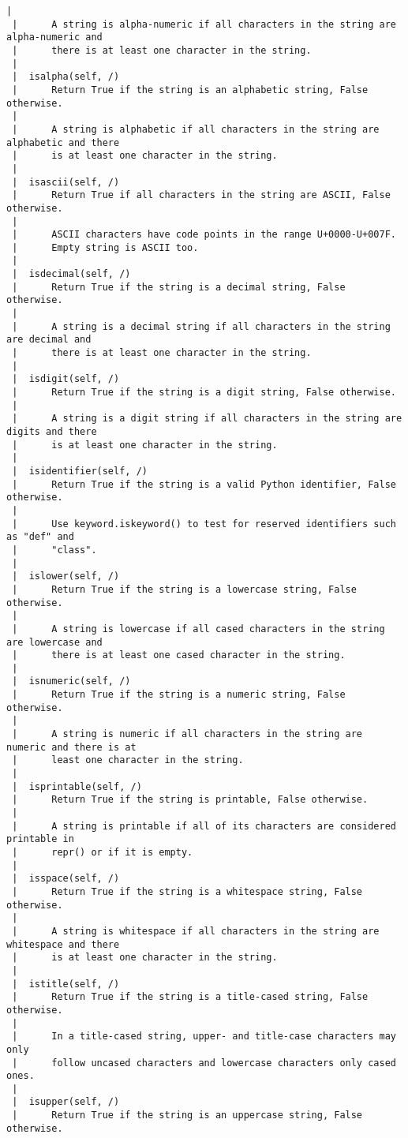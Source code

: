 \begin{Verbatim}[commandchars=\\\{\}]
 |      
 |      A string is alpha-numeric if all characters in the string are alpha-numeric and
 |      there is at least one character in the string.
 |  
 |  isalpha(self, /)
 |      Return True if the string is an alphabetic string, False otherwise.
 |      
 |      A string is alphabetic if all characters in the string are alphabetic and there
 |      is at least one character in the string.
 |  
 |  isascii(self, /)
 |      Return True if all characters in the string are ASCII, False otherwise.
 |      
 |      ASCII characters have code points in the range U+0000-U+007F.
 |      Empty string is ASCII too.
 |  
 |  isdecimal(self, /)
 |      Return True if the string is a decimal string, False otherwise.
 |      
 |      A string is a decimal string if all characters in the string are decimal and
 |      there is at least one character in the string.
 |  
 |  isdigit(self, /)
 |      Return True if the string is a digit string, False otherwise.
 |      
 |      A string is a digit string if all characters in the string are digits and there
 |      is at least one character in the string.
 |  
 |  isidentifier(self, /)
 |      Return True if the string is a valid Python identifier, False otherwise.
 |      
 |      Use keyword.iskeyword() to test for reserved identifiers such as "def" and
 |      "class".
 |  
 |  islower(self, /)
 |      Return True if the string is a lowercase string, False otherwise.
 |      
 |      A string is lowercase if all cased characters in the string are lowercase and
 |      there is at least one cased character in the string.
 |  
 |  isnumeric(self, /)
 |      Return True if the string is a numeric string, False otherwise.
 |      
 |      A string is numeric if all characters in the string are numeric and there is at
 |      least one character in the string.
 |  
 |  isprintable(self, /)
 |      Return True if the string is printable, False otherwise.
 |      
 |      A string is printable if all of its characters are considered printable in
 |      repr() or if it is empty.
 |  
 |  isspace(self, /)
 |      Return True if the string is a whitespace string, False otherwise.
 |      
 |      A string is whitespace if all characters in the string are whitespace and there
 |      is at least one character in the string.
 |  
 |  istitle(self, /)
 |      Return True if the string is a title-cased string, False otherwise.
 |      
 |      In a title-cased string, upper- and title-case characters may only
 |      follow uncased characters and lowercase characters only cased ones.
 |  
 |  isupper(self, /)
 |      Return True if the string is an uppercase string, False otherwise.

\end{Verbatim}
